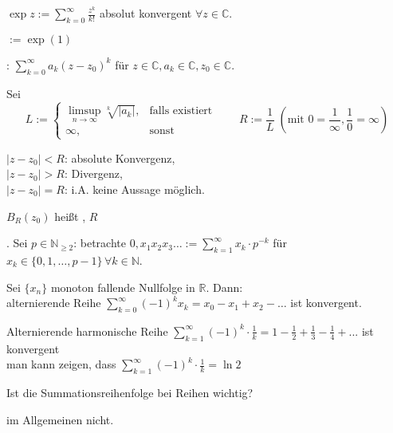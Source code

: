\begin{example}
	 $\exp z := \sum_{k=0}^\infty \frac{z^k}{k!}$ absolut konvergent $\forall z\in \mathbb{C}$.
	
	$:=\exp(1)$ 
\end{example}
\begin{example}
	: $\sum_{k=0}^\infty a_k(z-z_0)^k$ für $z\in\mathbb{C}, a_k\in\mathbb{C}, z_0\in\mathbb{C}$.
	
	Sei \[L:=\begin{cases} \limsup\limits_{n\rightarrow\infty} \sqrt[k]{|a_k|},&\text{falls existiert}\\ \infty,&\text{sonst}\end{cases}\qquad R:=\frac{1}{L} \;(\text{mit }0 = \frac{1}{\infty}, \frac{1}{0} = \infty)\]
	
	$ |z - z_0| < R$: absolute Konvergenz,\\
	$|z-z_0| > R$: Divergenz,\\
	$|z-z_0| = R$: i.A. keine Aussage möglich.
	
	$B_R(z_0)$ heißt , $R$ 
\end{example}
\begin{example}
	. Sei $p\in\mathbb{N}_{\ge 2}$: betrachte $0,x_1x_2x_3\dotsc :=\sum_{k=1}^\infty x_k\cdot p^{-k}$ für $x_k\in\{0,1,\dotsc,p-1\}\,\forall k\in\mathbb{N}$.
\end{example}
\begin{proposition}
	Sei $\{x_n\}$ monoton fallende Nullfolge in $\mathbb{R}$. Dann:\\
	alternierende Reihe $\sum_{k=0}^\infty (-1)^k x_k = x_0 - x_1 + x_2 - \dotsc$ ist konvergent.
\end{proposition}

\begin{example}
	Alternierende harmonische Reihe $\sum_{k=1}^{\infty} (-1)^k\cdot\frac{1}{k}=1-\frac{1}{2}+\frac{1}{3} - \frac{1}{4}+...$ ist konvergent \\
	man kann zeigen, dass $\sum_{k=1}^{\infty} (-1)^k\cdot\frac{1}{k}=\ln 2$
\end{example}

\begin{boldenvironment}[Frage]
	Ist die Summationsreihenfolge bei Reihen wichtig?
\end{boldenvironment}
\begin{boldenvironment}[Antwort]
	im Allgemeinen nicht.
\end{boldenvironment}

